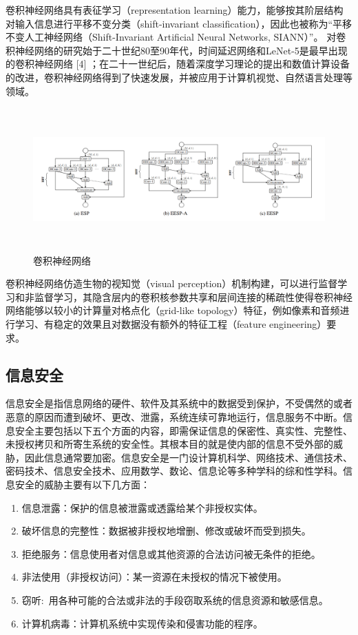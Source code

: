 \documentclass{article}
\begin{document}
卷积神经网络具有表征学习（representation learning）能力，能够按其阶层结构对输入信息进行平移不变分类（shift-invariant classification），因此也被称为“平移不变人工神经网络（Shift-Invariant Artificial Neural Networks, SIANN）”。
对卷积神经网络的研究始于二十世纪80至90年代，时间延迟网络和LeNet-5是最早出现的卷积神经网络 [4]  ；在二十一世纪后，随着深度学习理论的提出和数值计算设备的改进，卷积神经网络得到了快速发展，并被应用于计算机视觉、自然语言处理等领域。
\begin{figure}[h!]
                \centering
                \includegraphics[width=12.5cm,height=5.5cm]{8.png}
                \caption{卷积神经网络}
                \label{fig:universe}
            \end{figure}
卷积神经网络仿造生物的视知觉（visual perception）机制构建，可以进行监督学习和非监督学习，其隐含层内的卷积核参数共享和层间连接的稀疏性使得卷积神经网络能够以较小的计算量对格点化（grid-like topology）特征，例如像素和音频进行学习、有稳定的效果且对数据没有额外的特征工程（feature engineering）要求。
\subsection{信息安全}
信息安全是指信息网络的硬件、软件及其系统中的数据受到保护，不受偶然的或者恶意的原因而遭到破坏、更改、泄露，系统连续可靠地运行，信息服务不中断。信息安全主要包括以下五个方面的内容，即需保证信息的保密性、真实性、完整性、未授权拷贝和所寄生系统的安全性。其根本目的就是使内部的信息不受外部的威胁，因此信息通常要加密。信息安全是一门设计算机科学、网络技术、通信技术、密码技术、信息安全技术、应用数学、数论、信息论等多种学科的综和性学科。信息安全的威胁主要有以下几方面： 

\begin{enumerate}[(1)]  
    \item 信息泄露：保护的信息被泄露或透露给某个非授权实体。   
    \item 破坏信息的完整性：数据被非授权地增删、修改或破坏而受到损失。
    \item 拒绝服务：信息使用者对信息或其他资源的合法访问被无条件的拒绝。 
    \item 非法使用（非授权访问）：某一资源在未授权的情况下被使用。
    \item 窃听: 用各种可能的合法或非法的手段窃取系统的信息资源和敏感信息。
    \item 计算机病毒：计算机系统中实现传染和侵害功能的程序。
\end{enumerate}
\end{document}
